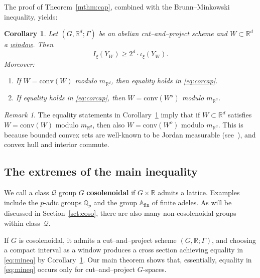 \documentclass{amsart}
\numberwithin{equation}{subsection}
\newtheorem{cor}[thm]{Corollary}
\theoremstyle{remark}
\newtheorem{rem}[thm]{Remark}
\begin{document}
The proof of Theorem~\ref{mthm:cap}, combined with the Brunn--Minkowski inequality, yields:

\begin{cor}\label{cor:cap}
Let \(\left(G,\mathbb{R}^{d};\Gamma\right)\) be an abelian cut--and--project scheme and \(W\subset\mathbb{R}^{d}\) a \hyperlink{window}{window}. Then 
\begin{equation}\label{eq:corcap}
I_{\xi}\left(Y_{W}\right)\geq 2^{d}\cdot\iota_{\xi}\left(Y_{W}\right).
\end{equation}
Moreover:
\begin{enumerate}
    \item If \(W=\mathrm{conv}\left(W\right)\) modulo \(m_{\mathbb{R}^{d}}\), then equality holds in \eqref{eq:corcap}.
    \item If equality holds in \eqref{eq:corcap}, then \(W=\mathrm{conv}\left(W^{o}\right)\) modulo \(m_{\mathbb{R}^{d}}\).
\end{enumerate}
\end{cor}

\begin{rem}
The equality statements in Corollary~\ref{cor:cap} imply that if \(W\subset\mathbb{R}^{d}\) satisfies \(W=\mathrm{conv}\left(W\right)\) modulo \(m_{\mathbb{R}^{d}}\), then also \(W=\mathrm{conv}\left(W^{o}\right)\) modulo \(m_{\mathbb{R}^{d}}\). This is because bounded convex sets are well-known to be Jordan measurable (see~\cite{szabo1997simple}), and convex hull and interior commute.
\end{rem}

\subsection{The extremes of the main inequality}

We call a class \(\mathcal{Q}\) group \(G\) {\bf cosolenoidal} if \(G\times\mathbb{R}\) admits a lattice. Examples include the \(p\)-adic groups \(\mathbb{Q}_{p}\) and the group \(\mathbb{A}_{\mathrm{fin}}\) of finite adeles. As will be discussed in Section~\ref{sct:coso}, there are also many non-cosolenoidal groups within class~\(\mathcal{Q}\).

If \(G\) is cosolenoidal, it admits a cut--and--project scheme \(\left(G,\mathbb{R};\Gamma\right)\), and choosing a compact interval as a window produces a cross section achieving equality in \eqref{eq:mineq} by Corollary~\ref{cor:cap}. Our main theorem shows that, essentially, equality in \eqref{eq:mineq} occurs only for cut--and--project \(G\)-spaces.
\end{document}
